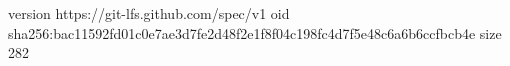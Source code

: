 version https://git-lfs.github.com/spec/v1
oid sha256:bac11592fd01c0e7ae3d7fe2d48f2e1f8f04c198fc4d7f5e48c6a6b6ccfbcb4e
size 282
